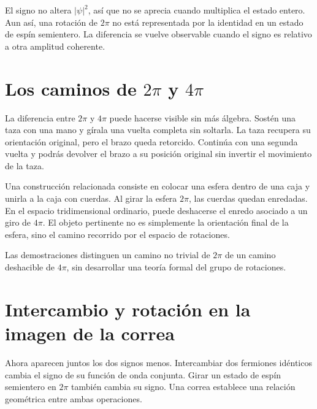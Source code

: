 El signo no altera \(\lvert\psi\rvert^2\), así que no se aprecia cuando multiplica el estado entero. Aun así, una rotación de \(2\pi\) no está representada por la identidad en un estado de espín semientero. La diferencia se vuelve observable cuando el signo es relativo a otra amplitud coherente.

\section{Los caminos de \texorpdfstring{\(2\pi\) y \(4\pi\)}{2 pi y 4 pi}}

La diferencia entre \(2\pi\) y \(4\pi\) puede hacerse visible sin más álgebra. Sostén una taza con una mano y gírala una vuelta completa sin soltarla. La taza recupera su orientación original, pero el brazo queda retorcido. Continúa con una segunda vuelta y podrás devolver el brazo a su posición original sin invertir el movimiento de la taza.

Una construcción relacionada consiste en colocar una esfera dentro de una caja y unirla a la caja con cuerdas. Al girar la esfera \(2\pi\), las cuerdas quedan enredadas. En el espacio tridimensional ordinario, puede deshacerse el enredo asociado a un giro de \(4\pi\). El objeto pertinente no es simplemente la orientación final de la esfera, sino el camino recorrido por el espacio de rotaciones.

\begin{classroomqa}
\end{classroomqa}

Las demostraciones distinguen un camino no trivial de \(2\pi\) de un camino deshacible de \(4\pi\), sin desarrollar una teoría formal del grupo de rotaciones.

\section{Intercambio y rotación en la imagen de la correa}

Ahora aparecen juntos los dos signos menos. Intercambiar dos fermiones idénticos cambia el signo de su función de onda conjunta. Girar un estado de espín semientero en \(2\pi\) también cambia su signo. Una correa establece una relación geométrica entre ambas operaciones.

